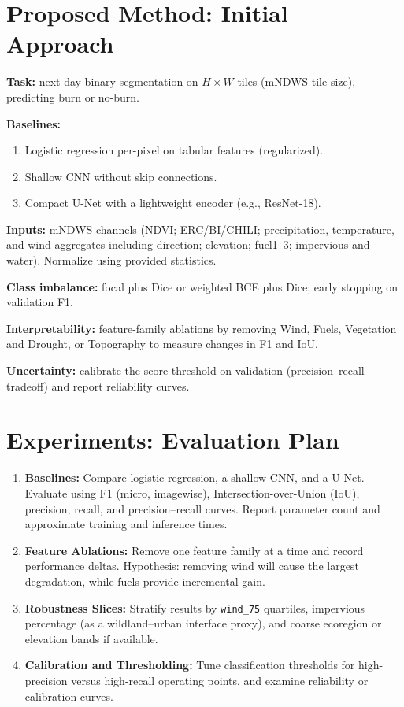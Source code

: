 \documentclass[conference]{IEEEtran}
\begin{document}
\section{Proposed Method: Initial Approach}
\textbf{Task:} next-day binary segmentation on $H\times W$ tiles (mNDWS tile size), predicting burn or no-burn.

\textbf{Baselines:}
\begin{enumerate}
    \item Logistic regression per-pixel on tabular features (regularized).
    \item Shallow CNN without skip connections.
    \item Compact U-Net with a lightweight encoder (e.g., ResNet-18).
\end{enumerate}

\textbf{Inputs:} mNDWS channels (NDVI; ERC/BI/CHILI; precipitation, temperature, and wind aggregates including direction; elevation; fuel1--3; impervious and water). Normalize using provided statistics.

\textbf{Class imbalance:} focal plus Dice or weighted BCE plus Dice; early stopping on validation F1.

\textbf{Interpretability:} feature-family ablations by removing Wind, Fuels, Vegetation and Drought, or Topography to measure changes in F1 and IoU.

\textbf{Uncertainty:} calibrate the score threshold on validation (precision–recall tradeoff) and report reliability curves.

\section{Experiments: Evaluation Plan}

\begin{enumerate}
    \item \textbf{Baselines:} Compare logistic regression, a shallow CNN, and a U-Net. Evaluate using F1 (micro, imagewise), Intersection-over-Union (IoU), precision, recall, and precision–recall curves. Report parameter count and approximate training and inference times.

    \item \textbf{Feature Ablations:} Remove one feature family at a time and record performance deltas. Hypothesis: removing wind will cause the largest degradation, while fuels provide incremental gain.

    \item \textbf{Robustness Slices:} Stratify results by \texttt{wind\_75} quartiles, impervious percentage (as a wildland–urban interface proxy), and coarse ecoregion or elevation bands if available.

    \raggedright\item \textbf{Calibration and Thresholding:} Tune classification thresholds for high-precision versus high-recall operating points, and examine reliability or calibration curves.
\end{enumerate}
\end{document}

